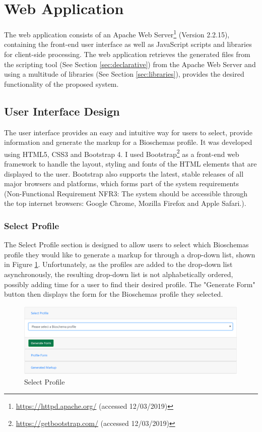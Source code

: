 \newpage
{
\section{Web Application}\label{sec:webapplication}
The web application consists of an Apache Web Server\footnote{\url{https://httpd.apache.org/} (accessed 12/03/2019)} (Version 2.2.15), containing the front-end user interface as well as JavaScript scripts and libraries for client-side processing. The web application retrieves the generated files from the scripting tool (See Section \ref{sec:declarative}) from the Apache Web Server and using a multitude of libraries (See Section \ref{sec:libraries}), provides the desired functionality of the proposed system. 

\subsection{User Interface Design}\label{sec:userInterface}
The user interface provides an easy and intuitive way for users to select, provide information and generate the markup for a Bioschemas profile. It was developed using HTML5, CSS3 and Bootstrap 4. I used Bootstrap\footnote{\url{https://getbootstrap.com/} (accessed 12/03/2019)} as a front-end web framework to handle the layout, styling and fonts of the HTML elements that are displayed to the user. Bootstrap also supports the latest, stable releases of all major browsers and platforms, which forms part of the system requirements (Non-Functional Requirement NFR3: The system should be accessible through the top internet browsers: Google Chrome, Mozilla Firefox and Apple Safari.).

\subsubsection*{Select Profile}
The Select Profile section is designed to allow users to select which Bioschemas profile they would like to generate a markup for through a drop-down list, shown in Figure \ref{fig:selectProfle}. Unfortunately, as the profiles are added to the drop-down list asynchronously, the resulting drop-down list is not alphabetically ordered, possibly adding time for a user to find their desired profile. The "Generate Form" button then displays the form for the Bioschemas profile they selected.\newline

\begin{figure}[!h]
 \centering\includegraphics[scale=0.65]{images/system/generateForm.PNG}
   \caption{Select Profile}
   \label{fig:selectProfle}
\end{figure}

}


